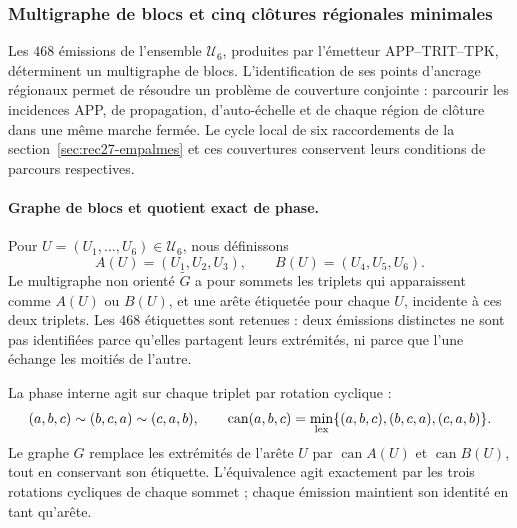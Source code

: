 \subsubsection{Multigraphe de blocs et cinq clôtures régionales minimales}
\label{regcl27:seccion}

Les \(468\) émissions de l'ensemble \(\mathcal U_6\), produites par
l'émetteur APP--TRIT--TPK, déterminent un multigraphe de blocs.
L'identification de ses points d'ancrage régionaux permet de résoudre un problème
de couverture conjointe : parcourir les incidences APP, de propagation,
d'auto-échelle et de chaque région de clôture dans une même marche fermée.
Le cycle local de six raccordements de la section~\ref{sec:rec27-empalmes}
et ces couvertures conservent leurs conditions de parcours respectives.

\paragraph{Graphe de blocs et quotient exact de phase.}
Pour \(U=(U_1,\ldots,U_6)\in\mathcal U_6\), nous définissons
\begin{equation}
 A(U)=(U_1,U_2,U_3),\qquad B(U)=(U_4,U_5,U_6).
 \label{regcl27:mitades}
\end{equation}
Le multigraphe non orienté \(\widetilde G\) a pour sommets les triplets
qui apparaissent comme \(A(U)\) ou \(B(U)\), et une arête étiquetée pour chaque
\(U\), incidente à ces deux triplets. Les \(468\) étiquettes sont retenues :
deux émissions distinctes ne sont pas identifiées parce qu'elles partagent leurs extrémités, ni
parce que l'une échange les moitiés de l'autre.

La phase interne agit sur chaque triplet par rotation cyclique :
\begin{equation}
 (a,b,c)\sim(b,c,a)\sim(c,a,b),\qquad
 \operatorname{can}(a,b,c)
 =\min_{\rm lex}\{(a,b,c),(b,c,a),(c,a,b)\}.
 \label{regcl27:fase}
\end{equation}
Le graphe \(G\) remplace les extrémités de l'arête \(U\) par
\(\operatorname{can}A(U)\) et \(\operatorname{can}B(U)\), tout en conservant
son étiquette. L'équivalence agit exactement par les trois rotations
cycliques de chaque sommet ; chaque émission maintient son identité en tant qu'arête.

